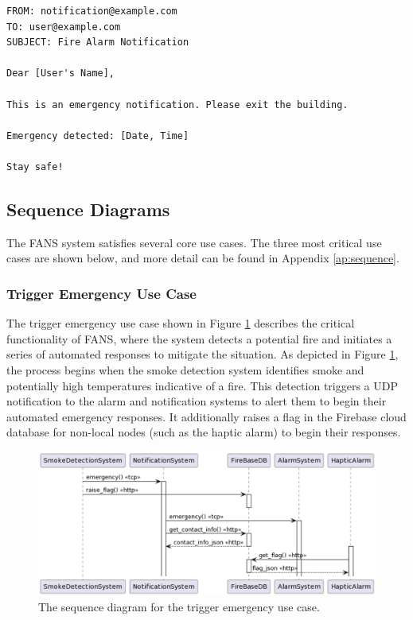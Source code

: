 {
\tiny
\begin{lstlisting}[label={lst:email},caption={Email notification for detected emergency in FANS.}]
FROM: notification@example.com
TO: user@example.com
SUBJECT: Fire Alarm Notification

Dear [User's Name],

This is an emergency notification. Please exit the building.

Emergency detected: [Date, Time]

Stay safe!
\end{lstlisting}
}

\subsection{Sequence Diagrams}

The FANS system satisfies several core use cases. The three most critical use cases are shown below, and more detail
can be found in Appendix \ref{ap:sequence}.

\subsubsection{Trigger Emergency Use Case}

The trigger emergency use case shown in Figure \ref{fig:trigger-emerg} describes the critical functionality of FANS,
where the system detects a potential fire and initiates a series of automated responses to mitigate the situation. As
depicted in Figure \ref{fig:trigger-emerg}, the process begins when the smoke detection system identifies smoke and
potentially high temperatures indicative of a fire. This detection triggers a UDP notification to the alarm and
notification systems to alert them to begin their automated emergency responses. It additionally raises a flag in the
Firebase cloud database for non-local nodes (such as the haptic alarm) to begin their responses.

\begin{figure}
    \centering
    \includegraphics[width=\imagewidth]{../assets/sequence/TriggerEmergencyUseCaseSequenceDiagram.png}
    \caption{The sequence diagram for the trigger emergency use case.}
    \label{fig:trigger-emerg}
\end{figure}

